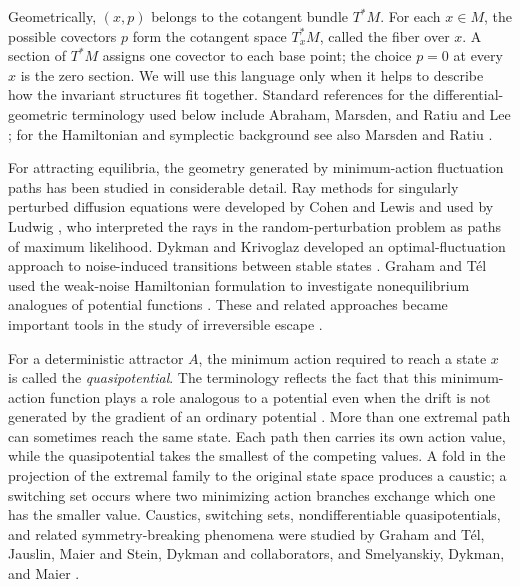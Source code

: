 \documentclass[11pt]{article}
\theoremstyle{definition}
\theoremstyle{remark}
\begin{document}
Geometrically, $(x,p)$ belongs to the cotangent bundle $T^*M$.  For each $x\in M$, the possible covectors $p$ form the cotangent space $T_x^*M$, called the fiber over $x$.  A section of $T^*M$ assigns one covector to each base point; the choice $p=0$ at every $x$ is the zero section.  We will use this language only when it helps to describe how the invariant structures fit together.  Standard references for the differential-geometric terminology used below include Abraham, Marsden, and Ratiu \cite{AbrahamMarsdenRatiu1988} and Lee \cite{Lee2012}; for the Hamiltonian and symplectic background see also Marsden and Ratiu \cite{MarsdenRatiu1999}.

For attracting equilibria, the geometry generated by minimum-action fluctuation paths has been studied in considerable detail.  Ray methods for singularly perturbed diffusion equations were developed by Cohen and Lewis \cite{CohenLewis1967} and used by Ludwig \cite{Ludwig1975}, who interpreted the rays in the random-perturbation problem as paths of maximum likelihood.  Dykman and Krivoglaz developed an optimal-fluctuation approach to noise-induced transitions between stable states \cite{DykmanKrivoglaz1979}.  Graham and T\'el used the weak-noise Hamiltonian formulation to investigate nonequilibrium analogues of potential functions \cite{GrahamTel1984,GrahamTel1985}.  These and related approaches became important tools in the study of irreversible escape \cite{MaierStein1993PRE,MaierStein1993PRL}.

For a deterministic attractor $A$, the minimum action required to reach a state $x$ is called the \emph{quasipotential}.  The terminology reflects the fact that this minimum-action function plays a role analogous to a potential even when the drift is not generated by the gradient of an ordinary potential \cite{FreidlinWentzell2012}.  More than one extremal path can sometimes reach the same state.  Each path then carries its own action value, while the quasipotential takes the smallest of the competing values.  A fold in the projection of the extremal family to the original state space produces a caustic; a switching set occurs where two minimizing action branches exchange which one has the smaller value.  Caustics, switching sets, nondifferentiable quasipotentials, and related symmetry-breaking phenomena were studied by Graham and T\'el, Jauslin, Maier and Stein, Dykman and collaborators, and Smelyanskiy, Dykman, and Maier \cite{GrahamTel1985,Jauslin1987,MaierStein1996,MaierStein1997,SmelyanskiyDykmanMaier1997}.
\end{document}
